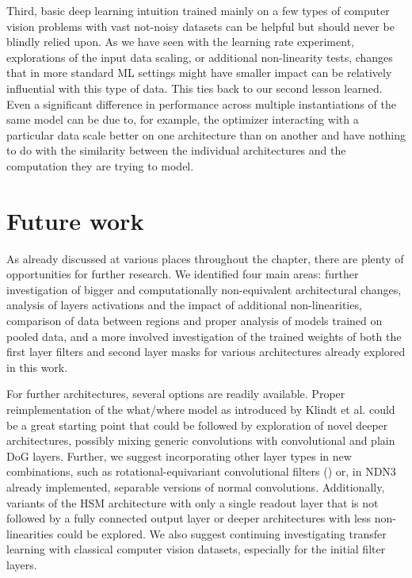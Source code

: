 Third, basic deep learning intuition trained mainly on a few types of computer vision problems with vast not-noisy datasets can be helpful but should never be blindly relied upon. As we have seen with the learning rate experiment, explorations of the input data scaling, or additional non-linearity tests, changes that in more standard ML settings might have smaller impact can be relatively influential with this type of data. This ties back to our second lesson learned. Even a significant difference in performance across multiple instantiations of the same model can be due to, for example, the optimizer interacting with a particular data scale better on one architecture than on another and have nothing to do with the similarity between the individual architectures and the computation they are trying to model.

\section*{Future work}

As already discussed at various places throughout the  chapter, there are plenty of opportunities for further research. We identified four main areas: further investigation of bigger and computationally non-equivalent architectural changes, analysis of layers activations and the impact of additional non-linearities, comparison of data between regions and proper analysis of models trained on pooled data, and a more involved investigation of the trained weights of both the first layer filters and second layer masks for various architectures already explored in this work.

For further architectures, several options are readily available. Proper reimplementation of the what/where model as introduced by Klindt et al. could be a great starting point that could be followed by exploration of novel deeper architectures, possibly mixing generic convolutions with convolutional and plain DoG layers. Further, we suggest incorporating other layer types in new combinations, such as rotational-equivariant convolutional filters (\cite{2018arXiv180910504E}) or, in NDN3 already implemented, separable versions of normal convolutions. Additionally, variants of the HSM architecture with only a single readout layer that is not followed by a fully connected output layer or deeper architectures with less non-linearities could be explored. We also suggest continuing investigating transfer learning with classical computer vision datasets, especially for the initial filter layers. 

